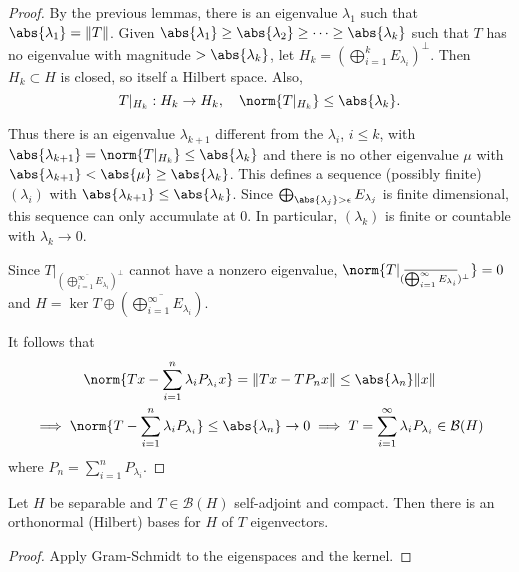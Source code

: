\documentclass{article}
\begin{document}
\begin{proof}
    By the previous lemmas, there is an eigenvalue $\lambda_1$ such that $\abs{\lambda_1} = \|T\|$.
    Given $\abs{\lambda_1} \geq \abs{\lambda_2} \geq \dotsb \geq \abs{\lambda_k}$ such that $T$ has no eigenvalue with magnitude $> \abs{\lambda_k}$, let $H_k = (\bigoplus_{i=1}^k E_{\lambda_i})^\perp$.
    Then $H_k \subset H$ is closed, so itself a Hilbert space.
    Also,
    \begin{equation*}
        T|_{H_k} : H_k \to H_k, \quad \norm{T|_{H_k}} \leq \abs{\lambda_k}.
    \end{equation*}

    Thus there is an eigenvalue $\lambda_{k + 1}$ different from the $\lambda_i$, $i \leq k$, with $\abs{\lambda_{k+1}} = \norm{T|_{H_k}} \leq \abs{\lambda_k}$ and there is no other eigenvalue $\mu$ with $\abs{\lambda_{k+1}} < \abs{\mu} \geq \abs{\lambda_k}$.
    This defines a sequence (possibly finite) $(\lambda_i)$ with $\abs{\lambda_{k+1}} \leq \abs{\lambda_k}$.
    Since
    $\bigoplus_{\abs{\lambda_j} > \epsilon} E_{\lambda_j}$ is finite dimensional, this sequence can only accumulate at 0.
    In particular, $(\lambda_k)$ is finite or countable with $\lambda_k \to 0$.

    Since $T|_{(\overline{\bigoplus_{i=1}^\infty E_{\lambda_i}})^\perp}$ cannot have a nonzero eigenvalue, $\norm{T|_{(\overline{\bigoplus_{i=1}^\infty E_{\lambda_i}})^\perp}} = 0$ and $H = \ker T \oplus (\overline{\bigoplus_{i=1}^\infty E_{\lambda_i}})$.

    It follows that
    \begin{gather*}
        \norm{T x - \sum_{i=1}^n \lambda_i P_{\lambda_i} x} = \|T x - T P_n x\| \leq \abs{\lambda_n} \|x\| \\
        \implies \norm{T - \sum_{i=1}^n \lambda_i P_{\lambda_i}} \leq \abs{\lambda_n} \to 0 \implies T = \sum_{i=1}^\infty \lambda_i P_{\lambda_i} \in \mathcal{B}(H)
    \end{gather*}
    where $P_n = \sum_{i=1}^n P_{\lambda_i}$.
\end{proof}

\begin{cor}
    Let $H$ be separable and $T \in \mathcal{B}(H)$ self-adjoint and compact.
    Then there is an orthonormal (Hilbert) bases for $H$ of $T$ eigenvectors.
\end{cor}
\begin{proof}
    Apply Gram-Schmidt to the eigenspaces and the kernel.
\end{proof}
\end{document}
